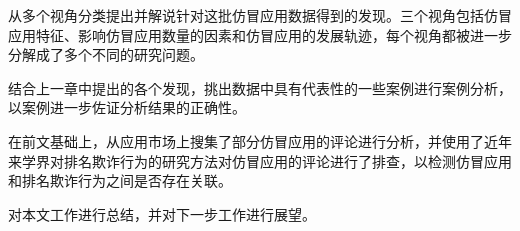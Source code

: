  从多个视角分类提出并解说针对这批仿冒应用数据得到的发现。三个视角包括仿冒应用特征、影响仿冒应用数量的因素和仿冒应用的发展轨迹，每个视角都被进一步分解成了多个不同的研究问题。

 结合上一章中提出的各个发现，挑出数据中具有代表性的一些案例进行案例分析，以案例进一步佐证分析结果的正确性。

 在前文基础上，从应用市场上搜集了部分仿冒应用的评论进行分析，并使用了近年来学界对排名欺诈行为的研究方法对仿冒应用的评论进行了排查，以检测仿冒应用和排名欺诈行为之间是否存在关联。

 对本文工作进行总结，并对下一步工作进行展望。
